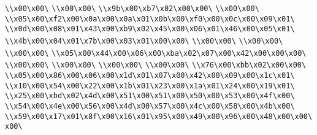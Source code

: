 \verb|\\x00\x00\|\newline
\verb|\\x00\x00\|\newline
\verb|\\x9b\x00\xb7\x02\x00\x00\|\newline
\verb|\\x00\x00\|\newline
\verb|\\x05\x00\xf2\x00\x0a\x00\x0a\x01\x0b\x00\xf0\x00\x0c\x00\x09\x01\|\newline
\verb|\\x0d\x00\x08\x01\x43\x00\xb9\x02\x45\x00\x06\x01\x46\x00\x05\x01\|\newline
\verb|\\x4b\x00\x04\x01\x7b\x00\x03\x01\x00\x00\|\newline
\verb|\\x00\x00\|\newline
\verb|\\x00\x00\|\newline
\verb|\\x00\x00\|\newline
\verb|\\x05\x00\x44\x00\x06\x00\xba\x02\x07\x00\x42\x00\x00\x00\|\newline
\verb|\\x00\x00\|\newline
\verb|\\x00\x00\|\newline
\verb|\\x00\x00\|\newline
\verb|\\x00\x00\|\newline
\verb|\\x76\x00\xbb\x02\x00\x00\|\newline
\verb|\\x05\x00\x86\x00\x06\x00\x1d\x01\x07\x00\x42\x00\x09\x00\x1c\x01\|\newline
\verb|\\x10\x00\x54\x00\x22\x00\x1b\x01\x23\x00\x1a\x01\x24\x00\x19\x01\|\newline
\verb|\\x25\x00\xbd\x02\x4d\x00\x51\x00\x51\x00\x50\x00\x53\x00\x4f\x00\|\newline
\verb|\\x54\x00\x4e\x00\x56\x00\x4d\x00\x57\x00\x4c\x00\x58\x00\x4b\x00\|\newline
\verb|\\x59\x00\x17\x01\x8f\x00\x16\x01\x95\x00\x49\x00\x96\x00\x48\x00\x00\x00\|\newline
